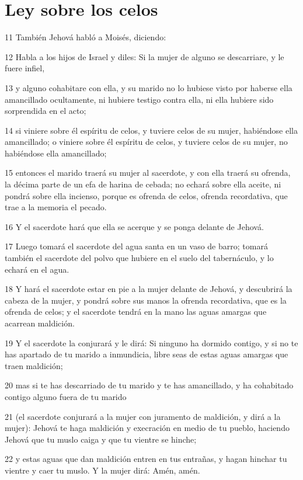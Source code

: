 \section*{Ley sobre los celos}

\par 11 También Jehová habló a Moisés, diciendo:
\par 12 Habla a los hijos de Israel y diles: Si la mujer de alguno se descarriare, y le fuere infiel,
\par 13 y alguno cohabitare con ella, y su marido no lo hubiese visto por haberse ella amancillado ocultamente, ni hubiere testigo contra ella, ni ella hubiere sido sorprendida en el acto;
\par 14 si viniere sobre él espíritu de celos, y tuviere celos de su mujer, habiéndose ella amancillado; o viniere sobre él espíritu de celos, y tuviere celos de su mujer, no habiéndose ella amancillado;
\par 15 entonces el marido traerá su mujer al sacerdote, y con ella traerá su ofrenda, la décima parte de un efa   de harina de cebada; no echará sobre ella aceite, ni pondrá sobre ella incienso, porque es ofrenda de celos, ofrenda recordativa, que trae a la memoria el pecado. 
\par 16 Y el sacerdote hará que ella se acerque y se ponga delante de Jehová.
\par 17 Luego tomará el sacerdote del agua santa en un vaso de barro; tomará también el sacerdote del polvo que hubiere en el suelo del tabernáculo, y lo echará en el agua.
\par 18 Y hará el sacerdote estar en pie a la mujer delante de Jehová, y descubrirá la cabeza de la mujer, y pondrá sobre sus manos la ofrenda recordativa, que es la ofrenda de celos; y el sacerdote tendrá en la mano las aguas amargas que acarrean maldición.
\par 19 Y el sacerdote la conjurará y le dirá: Si ninguno ha dormido contigo, y si no te has apartado de tu marido a inmundicia, libre seas de estas aguas amargas que traen maldición;
\par 20 mas si te has descarriado de tu marido y te has amancillado, y ha cohabitado contigo alguno fuera de tu marido
\par 21 (el sacerdote conjurará a la mujer con juramento de maldición, y dirá a la mujer): Jehová te haga maldición y execración en medio de tu pueblo, haciendo Jehová que tu muslo caiga y que tu vientre se hinche;
\par 22 y estas aguas que dan maldición entren en tus entrañas, y hagan hinchar tu vientre y caer tu muslo. Y la mujer dirá: Amén, amén.
